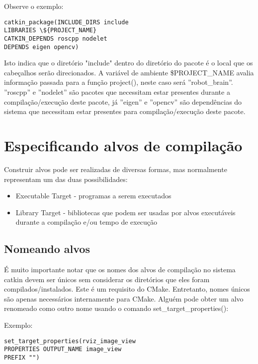 Observe o exemplo:

\begin{verbatim} 
catkin_package(INCLUDE_DIRS include
LIBRARIES \${PROJECT_NAME}
CATKIN_DEPENDS roscpp nodelet
DEPENDS eigen opencv)
\end{verbatim}

Isto indica que o diretório "include" dentro do diretório do pacote é o local que os cabeçalhos serão direcionados. A variável de ambiente \${PROJECT\_NAME} avalia informação passada para a função project(), neste caso será ''robot\_brain''. ''roscpp'' e ''nodelet'' são pacotes que necessitam estar presentes durante a compilação/execução deste pacote, já ''eigen'' e ''opencv'' são dependências do sistema que necessitam estar presentes para compilação/execução deste pacote.

\section{Especificando alvos de compilação}

Construir alvos pode ser realizadas de diversas formas, mas normalmente representam um das duas possibilidades:

\begin{itemize}
	\setlength{\itemsep}{1pt}
	\setlength{\parskip}{0pt}
	\setlength{\parsep}{0pt}
	\item[]Executable Target - programas a serem executados
	\item[]Library Target - bibliotecas que podem ser usadas por alvos executáveis durante a compilação e/ou tempo de execução
\end{itemize}

\subsection{Nomeando alvos}

É muito importante notar que os nomes dos alvos de compilação no sistema catkin devem ser únicos sem considerar os diretórios que eles foram compilados/instalados. Este é um requisito do CMake. Entretanto, nomes únicos são apenas necessários internamente para CMake. Alguém pode obter um alvo renomeado como outro nome usando o comando set\_target\_properties():

Exemplo:

\begin{verbatim}
set_target_properties(rviz_image_view
PROPERTIES OUTPUT_NAME image_view
PREFIX "")
\end{verbatim}

